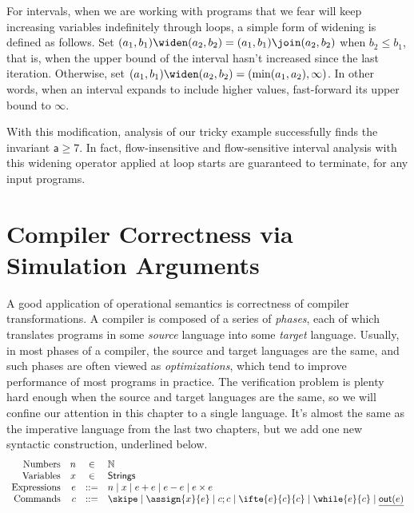 \documentclass{amsbook}
\theoremstyle{definition}
\theoremstyle{remark}
\numberwithin{section}{chapter}
\numberwithin{equation}{chapter}
\begin{document}
For intervals, when we are working with programs that we fear will keep increasing variables indefinitely through loops, a simple form of widening is defined as follows.
Set $(a_1, b_1) \widen (a_2, b_2) = (a_1, b_1) \join (a_2, b_2)$ when $b_2 \leq b_1$, that is, when the upper bound of the interval hasn't increased since the last iteration.
Otherwise, set $(a_1, b_1) \widen (a_2, b_2) = (\min(a_1, a_2), \infty)$.
In other words, when an interval expands to include higher values, fast-forward its upper bound to $\infty$.

With this modification, analysis of our tricky example successfully finds the invariant $\mathsf{a} \geq 7$.
In fact, flow-insensitive and flow-sensitive interval analysis with this widening operator applied at loop starts are guaranteed to terminate, for any input programs.



\chapter{\label{compiler_correctness}Compiler Correctness via Simulation Arguments}

\newcommand{\outp}[1]{\mathsf{out}(#1)}

A good application of operational semantics is correctness of compiler transformations.
A compiler is composed of a series of \emph{phases}, each of which translates programs in some \emph{source} language into some \emph{target} language.
Usually, in most phases of a compiler, the source and target languages are the same, and such phases are often viewed as \emph{optimizations}, which tend to improve performance of most programs in practice.
The verification problem is plenty hard enough when the source and target languages are the same, so we will confine our attention in this chapter to a single language.
It's almost the same as the imperative language from the last two chapters, but we add one new syntactic construction, underlined below.
$$\begin{array}{rrcl}
  \textrm{Numbers} & n &\in& \mathbb N \\
  \textrm{Variables} & x &\in& \mathsf{Strings} \\
  \textrm{Expressions} & e &::=& n \mid x \mid e + e \mid e - e \mid e \times e \\
  \textrm{Commands} & c &::=& \skipe \mid \assign{x}{e} \mid c; c \mid \ifte{e}{c}{c} \mid \while{e}{c} \mid \underline{\outp{e}}
\end{array}$$
\end{document}
